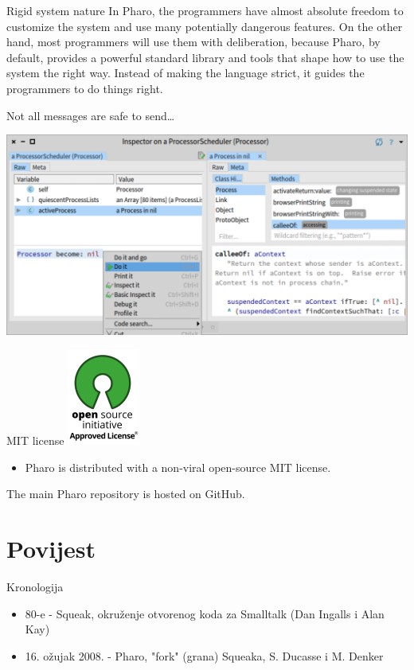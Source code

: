 \documentclass{beamer}
\begin{document}
\begin{frame}{Rigid system nature}
In Pharo, the programmers have almost absolute freedom to customize the system and use many potentially dangerous features. On the other hand, most programmers will use them with deliberation, because Pharo, by default, provides a powerful standard library and tools that shape how to use the system the right way. Instead of making the language strict, it guides the programmers to do things right.
\begin{block}{}
Not all messages are safe to send…
\end{block}
\includegraphics[width=0.5\linewidth]{dangerous.png}
\end{frame}

\begin{frame}{MIT license}
\includegraphics[width=0.5\linewidth]{OSIApproved.png}
\begin{itemize}
    \item Pharo is distributed with a non-viral open-source MIT license.
\end{itemize}
\begin{block}{}
 The main Pharo repository is hosted on GitHub.
\end{block}
\end{frame}

\section{Povijest}
\begin{frame}{Kronologija}
\begin{itemize}
    \item 80-e - Squeak, okruženje otvorenog koda za Smalltalk (Dan Ingalls i Alan Kay)
    \item 16. ožujak 2008. - Pharo, "fork" (grana) Squeaka, S. Ducasse i M. Denker
\end{itemize}
\end{frame}
\end{document}
